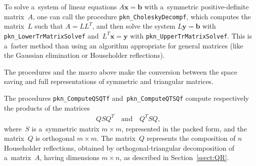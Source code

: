 \vspace{\medskipamount}
To solve a~system of linear equations $A\bm{x}=\bm{b}$ with a~symmetric
positive-definite matrix~$A$, one can call the procedure
\texttt{pkn\_CholeskyDecompf}, which computes the matrix~$L$
such that $A=LL^T$, and then solve the system
$L\bm{y}=\bm{b}$ with \texttt{pkn\_LowerTrMatrixSolvef}
and~$L^T\bm{x}=\bm{y}$ with \texttt{pkn\_UpperTrMatrixSolvef}.
This is a~faster method than using an algorithm appropriate for
general matrices (like the Gaussian elimination or Householder reflections).

\vspace{\bigskipamount}
The procedures and the macro above make the conversion between the space saving
and full representations of symmetric and triangular matrices.

\vspace{\bigskipamount}
The procedures \texttt{pkn\_ComputeQSQTf} and~\texttt{pkn\_ComputeQTSQf}
compute respectively the products of the matrices
\begin{align*}
  QSQ^T \quad\mbox{and}\quad Q^TSQ,
\end{align*}
where~$S$ is a~symmetric matrix $m\times m$, represented in the packed
form, and the matrix~$Q$ is orthogonal $m\times m$.
The matrix~$Q$ represents the composition of $n$ Householder reflections,
obtained by orthogonal-triangular decomposition of a~matrix~$A$,
having dimensions $m\times n$, as described in Section~\ref{ssect:QR}.

